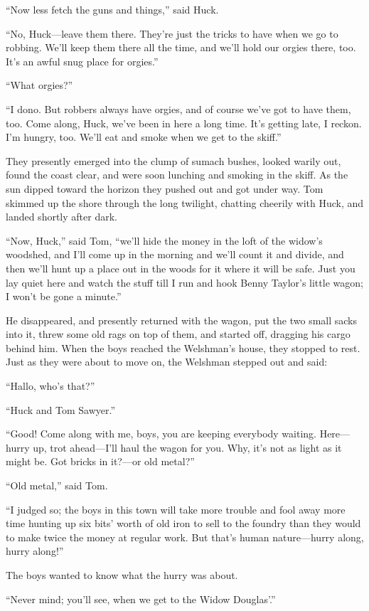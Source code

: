 \documentclass{book}
\begin{document}
“Now less fetch the guns and things,” said Huck.

“No, Huck—leave them there. They’re just the tricks to have when we go to robbing. We’ll keep them there all the time, and we’ll hold our orgies there, too. It’s an awful snug place for orgies.”

“What orgies?”

“I dono. But robbers always have orgies, and of course we’ve got to have them, too. Come along, Huck, we’ve been in here a long time. It’s getting late, I reckon. I’m hungry, too. We’ll eat and smoke when we get to the skiff.”

They presently emerged into the clump of sumach bushes, looked warily out, found the coast clear, and were soon lunching and smoking in the skiff. As the sun dipped toward the horizon they pushed out and got under way. Tom skimmed up the shore through the long twilight, chatting cheerily with Huck, and landed shortly after dark.

“Now, Huck,” said Tom, “we’ll hide the money in the loft of the widow’s woodshed, and I’ll come up in the morning and we’ll count it and divide, and then we’ll hunt up a place out in the woods for it where it will be safe. Just you lay quiet here and watch the stuff till I run and hook Benny Taylor’s little wagon; I won’t be gone a minute.”

He disappeared, and presently returned with the wagon, put the two small sacks into it, threw some old rags on top of them, and started off, dragging his cargo behind him. When the boys reached the Welshman’s house, they stopped to rest. Just as they were about to move on, the Welshman stepped out and said:

“Hallo, who’s that?”

“Huck and Tom Sawyer.”

“Good! Come along with me, boys, you are keeping everybody waiting. Here—hurry up, trot ahead—I’ll haul the wagon for you. Why, it’s not as light as it might be. Got bricks in it?—or old metal?”

“Old metal,” said Tom.

“I judged so; the boys in this town will take more trouble and fool away more time hunting up six bits’ worth of old iron to sell to the foundry than they would to make twice the money at regular work. But that’s human nature—hurry along, hurry along!”

The boys wanted to know what the hurry was about.

“Never mind; you’ll see, when we get to the Widow Douglas’.”
\end{document}
